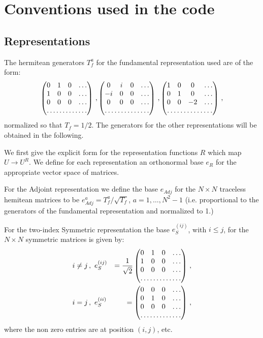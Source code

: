 \documentclass{article}[12pt]
\begin{document}
\section{Conventions used in the code}

\subsection{Representations}

The hermitean generators $T^a_f$ for the fundamental representation used are of the form:
\begin{equation}
\begin{pmatrix} 
0&1&0&\dots\\
1&0&0&\dots\\
0&0&0&\dots\\
\hdotsfor{4}
\end{pmatrix}\, ,
\begin{pmatrix} 
0&i&0&\dots\\
-i&0&0&\dots\\
0&0&0&\dots\\
\hdotsfor{4}
\end{pmatrix}\, ,
\begin{pmatrix} 
1&0&0&\dots\\
0&1&0&\dots\\
0&0&-2&\dots\\
\hdotsfor{4}
\end{pmatrix}\, ,
\end{equation}
normalized so that $T_f=1/2$. The generators for the other representations 
will be obtained in the following.

We first give the explicit form for the representation functions $R$ which map 
$U\rightarrow U^R$. We define for each representation an orthonormal base $e_R$ for 
the appropriate vector space of matrices. 

For the Adjoint representation we define the base $e_{Adj}$ for the $N\times N$ 
traceless hemitean matrices to be $e_{Adj}^a=T^a_f/\sqrt{T_f}$, $a=1,\dots,N^2-1$ 
(i.e. proportional to the generators of the fundamental representation and 
normalized to 1.)

For the two-index Symmetric representation the base $e^{(ij)}_{S}$, with $i\le j$, for 
the $N\times N$ symmetric matrices is given by:
\begin{eqnarray}
i\neq j \, ,\,\,\,&e^{(ij)}_S&=\frac{1}{\sqrt{2}}\begin{pmatrix} 
0&1&0&\dots\\
1&0&0&\dots\\
0&0&0&\dots\\
\hdotsfor{4}
\end{pmatrix}\, , \\
i=j \, ,\,\,\,&e^{(ii)}_S&=\begin{pmatrix} 
0&0&0&\dots\\
0&1&0&\dots\\
0&0&0&\dots\\
\hdotsfor{4}
\end{pmatrix}\, , 
\end{eqnarray}
where the non zero entries are at position $(i,j)$, etc.
\end{document}
